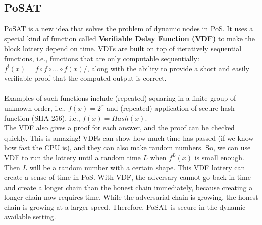 \documentclass{report}
\begin{document}
\subsection{PoSAT}
PoSAT is a new idea that solves the problem of dynamic nodes in PoS. It uses a special kind of function called \textbf{Verifiable Delay Function (VDF)} to make the block lottery depend on time. VDFs are built on top of iteratively sequential functions, i.e., functions that are only computable sequentially: $f^l(x) = f \circ f \circ ... \circ f(x)$/, along with the ability to provide a short
and easily verifiable proof that the computed output is correct.\\\\
Examples of such functions include (repeated) squaring in a finite group of unknown order, i.e., $f(x) = 2^x$ and (repeated) application of secure hash function (SHA-256), i.e., $f(x) = Hash(x)$.\\
The VDF also gives a proof for each answer, and the proof can be checked quickly. This is amazing! VDFs can show how much time has passed (if we know how fast the CPU is), and they can also make random numbers. So, we can use VDF to run the lottery until a random time $L$ when $f^L(x)$ is small enough. Then $L$ will be a random number with a certain shape. This VDF lottery can create a sense of time in PoS.
With VDF, the adversary cannot go back in time and create a longer chain than the honest
chain immediately, because creating a longer chain now requires time. While the adversarial chain is
growing, the honest chain is growing at a larger speed. Therefore, PoSAT is secure in the dynamic
available setting.
\end{document}
